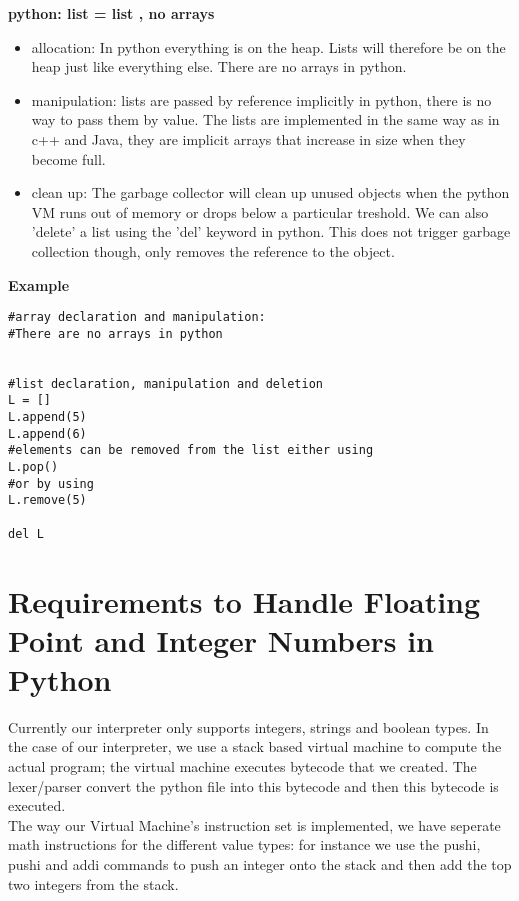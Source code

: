 \documentclass[11pt]{article}
\begin{document}
\pagebreak
\textbf{python: list = list , no arrays}
\begin{itemize}
    \item allocation:
        In python everything is on the heap.  Lists will therefore be on the
        heap just like everything else.  There are no arrays in python.

    \item manipulation:
        lists are passed by reference implicitly in python, there is no way to
        pass them by value.  The lists are implemented in the same way as in
        c++ and Java, they are implicit arrays that increase in size when they
        become full.

    \item clean up:
        The garbage collector will clean up unused objects when the python VM
        runs out of memory or drops below a particular treshold.  We can also
        'delete' a list using the 'del' keyword in python.  This does not
        trigger garbage collection though, only removes the reference to the
        object.
\end{itemize}


\textbf{Example}


\begin{lstlisting}[style=MyPython]
#array declaration and manipulation:
#There are no arrays in python


#list declaration, manipulation and deletion
L = []
L.append(5)
L.append(6)
#elements can be removed from the list either using
L.pop()
#or by using
L.remove(5)

del L
\end{lstlisting}



\newpage
\section{Requirements to Handle Floating Point and Integer Numbers in Python}
Currently our interpreter only supports integers, strings and boolean types.
In the case of our interpreter, we use a stack based virtual machine to compute
the actual program; the virtual machine executes bytecode that we created.  The
lexer/parser convert the python file into this bytecode and then this bytecode
is executed.\\

The way our Virtual Machine's instruction set is implemented, we have seperate
math instructions for the different value types: for instance we use
the pushi, pushi and addi commands to push an integer onto the stack and then add the
top two integers from the stack.\\
\end{document}
